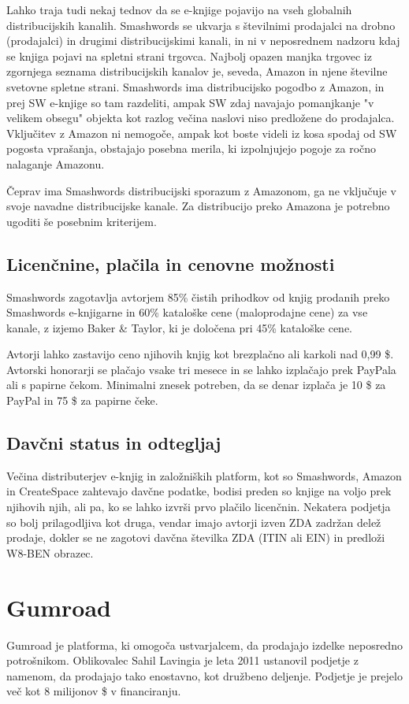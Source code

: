 \documentclass[a4paper, 12pt]{book}
\begin{document}
Lahko traja tudi nekaj tednov da se e-knjige pojavijo na vseh globalnih distribucijskih kanalih. Smashwords se ukvarja s številnimi prodajalci na drobno (prodajalci) in drugimi distribucijskimi kanali, in ni v neposrednem nadzoru kdaj se knjiga pojavi na spletni strani trgovca. Najbolj opazen manjka trgovec iz zgornjega seznama distribucijskih kanalov je, seveda, Amazon in njene številne svetovne spletne strani. Smashwords ima distribucijsko pogodbo z Amazon, in prej SW e-knjige so tam razdeliti, ampak SW zdaj navajajo pomanjkanje "v velikem obsegu" objekta kot razlog večina naslovi niso predložene do prodajalca. Vključitev z Amazon ni nemogoče, ampak kot boste videli iz kosa spodaj od SW pogosta vprašanja, obstajajo posebna merila, ki izpolnjujejo pogoje za ročno nalaganje Amazonu. 

Čeprav ima Smashwords distribucijski sporazum z Amazonom, ga ne vključuje v svoje navadne distribucijske kanale. Za distribucijo preko Amazona je potrebno ugoditi še posebnim kriterijem.

\subsection{Licenčnine, plačila in cenovne možnosti}
Smashwords zagotavlja avtorjem 85\% čistih prihodkov od  knjig prodanih preko Smashwords e-knjigarne in 60\% kataloške cene (maloprodajne cene) za vse kanale, z izjemo Baker \& Taylor, ki je določena pri 45\% kataloške cene.

Avtorji lahko zastavijo ceno njihovih knjig kot brezplačno ali karkoli nad 0,99 \$. Avtorski honorarji se plačajo vsake tri mesece in se lahko izplačajo prek PayPala ali s papirne čekom. Minimalni znesek potreben, da se denar izplača je 10 \$ za PayPal in 75 \$ za papirne čeke.

\subsection{Davčni status in odtegljaj }
Večina distributerjev e-knjig in založniških platform, kot so Smashwords, Amazon in CreateSpace zahtevajo davčne podatke, bodisi preden so knjige na voljo prek njihovih njih, ali pa, ko se lahko izvrši prvo plačilo licenčnin. Nekatera podjetja so bolj prilagodljiva kot druga, vendar imajo avtorji izven ZDA zadržan delež prodaje, dokler se ne zagotovi davčna številka ZDA (ITIN ali EIN) in predloži W8-BEN obrazec. 

\section{Gumroad}
Gumroad je platforma, ki omogoča ustvarjalcem, da prodajajo izdelke neposredno potrošnikom. Oblikovalec Sahil Lavingia je leta 2011 ustanovil podjetje z namenom, da prodajajo tako enostavno, kot družbeno deljenje. \cite{47} Podjetje je prejelo več kot 8 milijonov \$ v financiranju. \cite{48}
\end{document}
